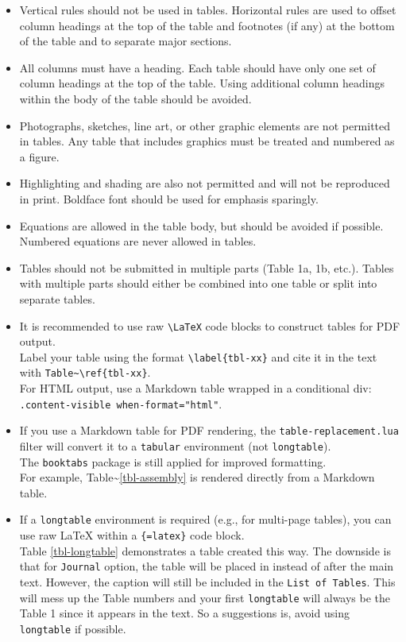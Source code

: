 \documentclass[Journal,LineNumbers]{ascelike-new}
\begin{document}
\begin{itemize}
\item
  Vertical rules should not be used in tables. Horizontal rules are used
  to offset column headings at the top of the table and footnotes (if
  any) at the bottom of the table and to separate major sections.
\item
  All columns must have a heading. Each table should have only one set
  of column headings at the top of the table. Using additional column
  headings within the body of the table should be avoided.
\item
  Photographs, sketches, line art, or other graphic elements are not
  permitted in tables. Any table that includes graphics must be treated
  and numbered as a figure.
\item
  Highlighting and shading are also not permitted and will not be
  reproduced in print. Boldface font should be used for emphasis
  sparingly.
\item
  Equations are allowed in the table body, but should be avoided if
  possible. Numbered equations are never allowed in tables.
\item
  Tables should not be submitted in multiple parts (Table 1a, 1b, etc.).
  Tables with multiple parts should either be combined into one table or
  split into separate tables.
\item
  It is recommended to use raw \texttt{\textbackslash{}LaTeX} code
  blocks to construct tables for PDF output.\\
  Label your table using the format
  \texttt{\textbackslash{}label\{tbl-xx\}} and cite it in the text with
  \texttt{Table\textasciitilde{}\textbackslash{}ref\{tbl-xx\}}.\\
  For HTML output, use a Markdown table wrapped in a conditional div:\\
  \texttt{.content-visible\ when-format="html"}.
\item
  If you use a Markdown table for PDF rendering, the
  \texttt{table-replacement.lua} filter will convert it to a
  \texttt{tabular} environment (not \texttt{longtable}).\\
  The \texttt{booktabs} package is still applied for improved
  formatting.\\
  For example, Table\textasciitilde{}\ref{tbl-assembly} is rendered
  directly from a Markdown table.
\item
  If a \texttt{longtable} environment is required (e.g., for multi-page
  tables), you can use raw LaTeX within a \texttt{\{=latex\}} code
  block.\\
  Table \ref{tbl-longtable} demonstrates a table created this way. The
  downside is that for \texttt{Journal} option, the table will be placed
  in instead of after the main text. However, the caption will still be
  included in the \texttt{List\ of\ Tables}. This will mess up the Table
  numbers and your first \texttt{longtable} will always be the Table 1
  since it appears in the text. So a suggestions is, avoid using
  \texttt{longtable} if possible.
\end{itemize}
\end{document}
